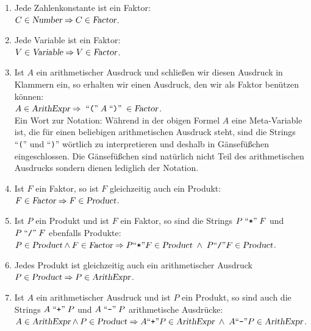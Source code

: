 \begin{enumerate}
\item Jede Zahlenkonstante ist ein Faktor:
      \\[0.2cm]
      \hspace*{1.3cm}
      $C \in \textsl{Number} \Rightarrow C \in \textsl{Factor}$.
\item Jede Variable ist ein Faktor:
      \\[0.2cm]
      \hspace*{1.3cm}
      $V \in \textsl{Variable} \Rightarrow V \in \textsl{Factor}$.
\item Ist $A$ ein arithmetischer Ausdruck und schlie{\ss}en wir diesen Ausdruck in Klammern
      ein, so erhalten wir einen Ausdruck, den wir als Faktor ben\"utzen k\"onnen:
      \\[0.2cm]
      \hspace*{1.3cm}
      $A \in \textsl{ArithExpr} \Rightarrow \;\mbox{``\texttt{(}''}\;A\;\mbox{``\texttt{)}''}\; \in \textsl{Factor}$. 
      \\[0.2cm] 
      Ein Wort zur Notation: W\"ahrend in der obigen Formel $A$ eine Meta-Variable ist, die f\"ur
      einen beliebigen arithmetischen Ausdruck steht, sind die Strings ``\texttt{(}'' 
      und ``\texttt{)}'' w\"ortlich zu interpretieren und 
      deshalb in G\"ansef\"u{\ss}chen eingeschlossen.  Die G\"ansef\"u{\ss}chen sind nat\"urlich nicht Teil
      des arithmetischen 
      Ausdrucks sondern dienen lediglich der Notation.
\item Ist $F$ ein Faktor, so ist $F$ gleichzeitig auch ein Produkt:
      \\[0.2cm]
      \hspace*{1.3cm}
      $F \in \textsl{Factor} \Rightarrow F \in \textsl{Product}$.
\item Ist $P$ ein Produkt und ist $F$ ein Faktor, so sind die Strings 
      $P \;\mbox{``\texttt{*}''}\; F$ und 
      $P \;\mbox{``\texttt{/}''}\; F$ ebenfalls Produkte:
      \\[0.2cm]
      \hspace*{1.3cm}
      $P \in \textsl{Product} \wedge F \in \textsl{Factor} \Rightarrow 
       P \mbox{``\texttt{*}''} F \in \textsl{Product} \;\wedge\; P \mbox{``\texttt{/}''} F \in \textsl{Product}$.
\item Jedes Produkt ist gleichzeitig auch ein arithmetischer Ausdruck
      \\[0.2cm]
      \hspace*{1.3cm}
      $P \in \textsl{Product} \Rightarrow P \in \textsl{ArithExpr}$.
\item Ist $A$ ein arithmetischer Ausdruck und ist $P$ ein Produkt, so sind auch
      die Strings $A \;\mbox{``\texttt{+}''}\; P$ und $A \;\mbox{``\texttt{-}''}\; P$  arithmetische Ausdr\"ucke:
      \\[0.2cm]
      \hspace*{1.3cm}
      $A \in \textsl{ArithExpr} \wedge P \in \textsl{Product} \Rightarrow
       A \mbox{``\texttt{+}''} P \in \textsl{ArithExpr} \;\wedge\; A \mbox{``\texttt{-}''} P \in \textsl{ArithExpr}$.
\end{enumerate}
